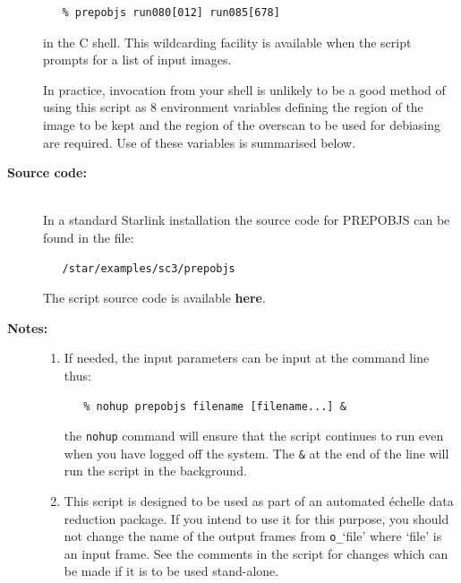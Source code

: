 \documentclass[twoside,11pt]{article}
\newenvironment{latexonly}{}{}
\newcommand{\htmlref}[2]{#1}
\begin{document}
\begin{description}
\begin{verbatim}
   % prepobjs run080[012] run085[678]
\end{verbatim}

     in the C shell.  This wildcarding facility is available when the
     script prompts for a list of input images.

     In practice, invocation from your shell is unlikely to be a good
     method of using this script as 8 environment variables defining
     the region of the image to be kept and the region of the overscan
     to be used for debiasing are required.  Use of these variables is
     summarised below.

\item [{\bf Source code:}] \mbox{} \\
\begin{latexonly}
In a standard Starlink installation the source code for PREPOBJS can be found
in the file:
\begin{verbatim}
   /star/examples/sc3/prepobjs
\end{verbatim}
\end{latexonly}
\begin{htmlonly}
      The script source code is available
      \htmlref{{\bf here}}{se_prepobjs_source}.
\end{htmlonly}

\item [{\bf Notes:}] \mbox{}
\begin{enumerate}

\item If needed, the input parameters can be input at the command
      line thus:

\begin{verbatim}
   % nohup prepobjs filename [filename...] &
\end{verbatim}

      the \verb+nohup+ command will ensure that the script continues
      to run even when you have logged off the system.  The \verb+&+ at
      the end of the line will run the script in the background.

\item This script is designed to be used as part of an automated
      \'{e}chelle data reduction package.  If you intend to use it
      for this purpose, you should not change the name of the output
      frames from \verb+o_+`file' where `file' is an input frame.  See the
      comments in the script for changes which can be made if it is
      to be used stand-alone.


\end{enumerate}
\end{description}
\end{document}
